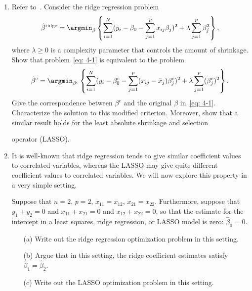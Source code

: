 \documentclass[10pt]{article}
\begin{document}
\begin{enumerate}[1.]
        
        \item Refer to~\cite[Ex. 3.5]{hastie2009elements}. Consider the ridge regression problem
        \begin{equation}\label{eq: 4-1}
        	\hat{\beta}^{\textrm{ridge}} = \argmin_{\beta}\left\lbrace\sum_{i=1}^{N}(y_i - \beta_{0} - \sum_{j=1}^{p}x_{ij}\beta_{j})^{2} + \lambda \sum_{j=1}^{p}\beta_{j}^{2}\right\rbrace, 
        \end{equation}
        where $\lambda \geq 0$ is a complexity parameter that controls the amount of shrinkage. Show that problem~\eqref{eq: 4-1} is equivalent to the problem
        \begin{equation}\label{eq: 4-2}
        	\hat{\beta}^{\textrm{c}} = \argmin_{\beta^{\textrm{c}}}\left\lbrace\sum_{i=1}^{N}(y_i - \beta_{0}^{\textrm{c}} - \sum_{j=1}^{p}(x_{ij}-\bar{x}_j)\beta_{j}^{\textrm{c}})^{2} + \lambda \sum_{j=1}^{p}(\beta_{j}^{\textrm{c}})^{2}\right\rbrace. 
        \end{equation}
        Give the correspondence between $\beta^{\textrm{c}}$ and the original $\beta$ in~\eqref{eq: 4-1}. Characterize the solution to this modified criterion. Moreover, show that a similar result holds for the least absolute shrinkage and selection

        operator (LASSO).~
        
        \item It is well-known that ridge regression tends to give similar coefficient values to correlated variables, whereas the LASSO may give quite different coefficient values to correlated variables. We will now explore this property in a very simple setting.
        
        Suppose that $n = 2$, $p = 2$, $x_{11} = x_{12}$, $x_{21} = x_{22}$. Furthermore,
suppose that $y_1 +y_2 = 0$ and $x_{11} +x_{21} = 0$ and $x_{12} +x_{22} = 0$, so that
the estimate for the intercept in a least squares, ridge regression, or LASSO model is zero: $\hat{\beta}_{0} = 0$.
        
        \begin{itemize}
        	\item[(a)] Write out the ridge regression optimization problem in this setting.~
        	 
        	\item[(b)] Argue that in this setting, the ridge coefficient estimates satisfy $\hat{\beta}_{1} = \hat{\beta}_{2}$.~
        	
        	\item[(c)] Write out the LASSO optimization problem in this setting.~
        	

\end{itemize}
\end{enumerate}
\end{document}
